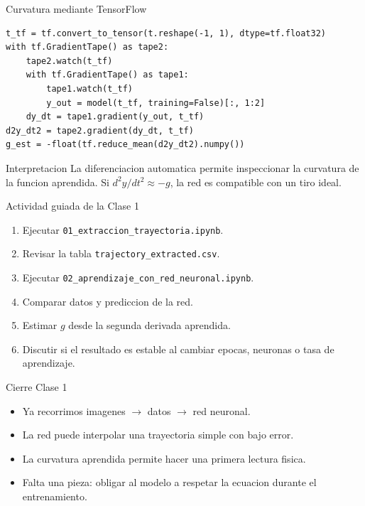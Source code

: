 \begin{frame}[fragile]{Curvatura mediante TensorFlow}
\begin{verbatim}
t_tf = tf.convert_to_tensor(t.reshape(-1, 1), dtype=tf.float32)
with tf.GradientTape() as tape2:
    tape2.watch(t_tf)
    with tf.GradientTape() as tape1:
        tape1.watch(t_tf)
        y_out = model(t_tf, training=False)[:, 1:2]
    dy_dt = tape1.gradient(y_out, t_tf)
d2y_dt2 = tape2.gradient(dy_dt, t_tf)
g_est = -float(tf.reduce_mean(d2y_dt2).numpy())
\end{verbatim}
\begin{block}{Interpretacion}
La diferenciacion automatica permite inspeccionar la curvatura de la funcion aprendida. Si $d^2y/dt^2 \approx -g$, la red es compatible con un tiro ideal.
\end{block}
\end{frame}

\begin{frame}{Actividad guiada de la Clase 1}
\begin{enumerate}
    \item Ejecutar \texttt{01\_extraccion\_trayectoria.ipynb}.
    \item Revisar la tabla \texttt{trajectory\_extracted.csv}.
    \item Ejecutar \texttt{02\_aprendizaje\_con\_red\_neuronal.ipynb}.
    \item Comparar datos y prediccion de la red.
    \item Estimar $g$ desde la segunda derivada aprendida.
    \item Discutir si el resultado es estable al cambiar epocas, neuronas o tasa de aprendizaje.
\end{enumerate}
\end{frame}

\begin{frame}{Cierre Clase 1}
\begin{itemize}
    \item Ya recorrimos imagenes $\rightarrow$ datos $\rightarrow$ red neuronal.
    \item La red puede interpolar una trayectoria simple con bajo error.
    \item La curvatura aprendida permite hacer una primera lectura fisica.
    \item Falta una pieza: obligar al modelo a respetar la ecuacion durante el entrenamiento.
\end{itemize}
\end{frame}


